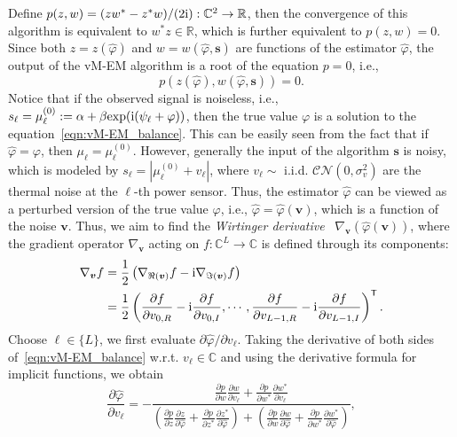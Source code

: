 \documentclass[journal,twocolumn]{IEEEtran}
\theoremstyle{nonumberplain}
\def \T {\bm \Theta}
\def \exp {\text{exp}}
\def \T {^{\mathsf{T}}}
\def \ri {{\rm i}}
\begin{document}
{    Define $p(z,w) = (zw^* - z^*w)/(2\ri): \mathbb{C}^2 \to \mathbb{R}$, then the convergence of this algorithm is equivalent to $w^*z\in\mathbb{R}$, which is further equivalent to $p(z,w)=0$. Since both $z=z(\hat{\varphi})$ and $w=w(\hat{\varphi}, {\bm s})$ are functions of the estimator $\hat{\varphi}$, the output of the vM-EM algorithm is a root of the equation $p=0$, i.e.,  
    \begin{equation}
        p(z(\hat{\varphi}),w(\hat{\varphi}, {\bm s}))=0 .
        \label{eqn:vM-EM_balance}
    \end{equation}
    Notice that if the observed signal is noiseless, i.e., $s_\ell = \mu_\ell^{(0)}:=\alpha+\beta\exp(\ri(\psi_\ell+\varphi))$, then the true value $\varphi$ is a solution to the equation~\eqref{eqn:vM-EM_balance}. This can be easily seen from the fact that if $\hat{\varphi} = \varphi$, then $\mu_\ell = \mu_\ell^{(0)}$.
    However, generally the input of the algorithm ${\bm s}$ is noisy, which is modeled by $s_\ell = |\mu_\ell^{(0)} + v_\ell|$, where $v_\ell \sim$ i.i.d. $\mathcal{CN}(0, \sigma_v^2)$ are the thermal noise at the $\ell$-th power sensor. Thus, the estimator $\hat\varphi$ can be viewed as a perturbed version of the true value $\varphi$, i.e., $\hat{\varphi} = \hat{\varphi}(\bm v)$, which is a function of the noise $\bm v$. 
    Thus, we aim to find the {\it Wirtinger derivative}~\cite{remmert1991theory} $\nabla_{\bm v}(\hat{\varphi}({\bm v}))$, where the gradient operator $\nabla_{{\bm v}}$ acting on $f: \mathbb{C}^L\to \mathbb{C}$ is defined through its components:
    \begin{equation}
        \begin{aligned}
        \nabla_{\bm v}f &= \frac{1}{2}\left( \nabla_{\Re({\bm v})} f -\ri \nabla_{\Im({\bm v})} f \right) \\
        &={\frac{1}{2}} \left( \frac{\partial f}{\partial v_{0, R}} -\ri \frac{\partial f}{\partial v_{0, I}}, \cdots,  \frac{\partial f}{\partial v_{L-1, R}} -\ri \frac{\partial f}{\partial v_{L-1, I}}\right)\T. 
        \end{aligned}
    \end{equation}
    Choose $\ell\in\{L\}$, we first evaluate $\partial \hat{\varphi}/\partial v_\ell$. Taking the derivative of both sides of~\eqref{eqn:vM-EM_balance} w.r.t. $v_\ell\in\mathbb{C}$ and using the derivative formula for implicit functions, we obtain 
    \begin{equation}
        \frac{\partial \hat\varphi}{\partial v_\ell}=-\frac{\frac{\partial p}{\partial w} \frac{\partial w}{\partial v_\ell}+\frac{\partial p}{\partial w^*} \frac{\partial w^*}{\partial v_\ell}}{\left(\frac{\partial p}{\partial z} \frac{\partial z}{\partial \hat\varphi}+\frac{\partial p}{\partial z^*} \frac{\partial z^*}{\partial \hat\varphi}\right)+\left(\frac{\partial p}{\partial w} \frac{\partial w}{\partial \hat\varphi}+\frac{\partial p}{\partial w^*} \frac{\partial w^*}{\partial \hat\varphi}\right)},

\end{equation}}
\end{document}
